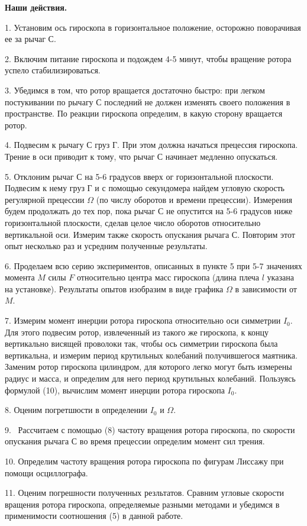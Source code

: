 \documentclass[14pt]{article}
\begin{document}
\vspace{1cm}
\textbf{Наши действия.}
\vspace{1cm}

1. Установим ось гироскопа в горизонтальное положение, осторожно поворачивая ее за рычаг С.

2. Включим питание гироскопа и подождем 4-5 минут, чтобы вращение ротора успело стабилизироваться.

3. Убедимся в том, что ротор вращается достаточно быстро: при легком постукивании по рычагу С последний не должен изменять своего положения в пространстве. По реакции гироскопа определим, в какую сторону вращается ротор.

4. Подвесим к рычагу С груз Г. При этом должна начаться прецессия гироскопа. Трение в оси приводит к тому, что рычаг С начинает медленно опускаться.

5. Отклоним рычаг С на 5-6 градусов вверх ог горизонтальной плоскости. Подвесим к нему груз Г и с помощью секундомера найдем угловую скорость регулярной прецессии $\Omega$ (по числу оборотов и времени прецессии). Измерения будем продолжать до тех пор, пока рычаг С не опустится на 5-6 градусов ниже горизонтальной плоскости, сделав целое число оборотов относительно вертикальной оси. Измерим также скорость опускания рычага С. Повторим этот опыт несколько раз и усредним полученные результаты.

6. Проделаем всю серию экспериментов, описанных в пункте 5 при 5-7 значениях момента $M$ силы $F$ относительно центра масс гироскопа (длина плеча $l$ указана на установке). Результаты опытов изобразим в виде графика $\Omega$ в зависимости от $M$.

7. Измерим момент инерции ротора гироскопа относительно оси симметрии $I_0$. Для этого подвесим ротор, извлеченный из такого же гироскопа, к концу вертикально висящей проволоки так, чтобы ось симметрии гироскопа была вертикальна, и измерим период крутильных колебаний получившегося маятника. Заменим ротор гироскопа цилиндром, для которого легко могут быть измерены радиус и масса, и определим для него период крутильных колебаний. Пользуясь формулой (10), вычислим момент инерции ротора гироскопа $I_0$.

8. Оценим погретшюсти в определении $I_0$ и $\Omega$.

9. ~Рассчитаем с помощью (8) частоту вращения ротора гироскопа, по скорости опускания рычага С во время прецессии определим момент сил трения.

10. Определим частоту вращения ротора гироскопа по фигурам Лиссажу при помощи осциллографа.

11. Оценим погрешности полученных резльтатов. Сравним угловые скорости вращения ротора гироскопа, определяемые разными методами и убедимся в применимости соотношения (5) в данной работе.
\end{document}
